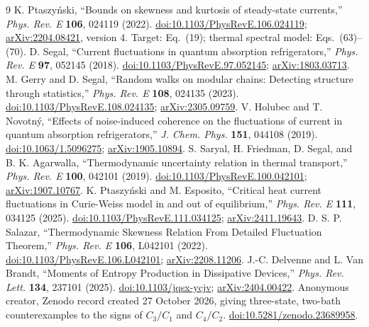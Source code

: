 \documentclass[11pt,a4paper]{article}
\begin{document}
\clearpage
\begingroup\setlength{\parskip}{3pt}
\begin{thebibliography}{9}\setlength{\itemsep}{4pt}
 K. Ptaszy\'nski, ``Bounds on skewness and kurtosis of steady-state currents,'' \emph{Phys. Rev. E} \textbf{106}, 024119 (2022). \href{https://doi.org/10.1103/PhysRevE.106.024119}{doi:10.1103/PhysRevE.106.024119}; \href{https://arxiv.org/abs/2204.08421}{arXiv:2204.08421}, version 4. Target: Eq.~(19); thermal spectral model: Eqs.~(63)--(70).
 D. Segal, ``Current fluctuations in quantum absorption refrigerators,'' \emph{Phys. Rev. E} \textbf{97}, 052145 (2018). \href{https://doi.org/10.1103/PhysRevE.97.052145}{doi:10.1103/PhysRevE.97.052145}; \href{https://arxiv.org/abs/1803.03713}{arXiv:1803.03713}.
 M. Gerry and D. Segal, ``Random walks on modular chains: Detecting structure through statistics,'' \emph{Phys. Rev. E} \textbf{108}, 024135 (2023). \href{https://doi.org/10.1103/PhysRevE.108.024135}{doi:10.1103/PhysRevE.108.024135}; \href{https://arxiv.org/abs/2305.09759}{arXiv:2305.09759}.
 V. Holubec and T. Novotn\'y, ``Effects of noise-induced coherence on the fluctuations of current in quantum absorption refrigerators,'' \emph{J. Chem. Phys.} \textbf{151}, 044108 (2019). \href{https://doi.org/10.1063/1.5096275}{doi:10.1063/1.5096275}; \href{https://arxiv.org/abs/1905.10894}{arXiv:1905.10894}.
 S. Saryal, H. Friedman, D. Segal, and B. K. Agarwalla, ``Thermodynamic uncertainty relation in thermal transport,'' \emph{Phys. Rev. E} \textbf{100}, 042101 (2019). \href{https://doi.org/10.1103/PhysRevE.100.042101}{doi:10.1103/PhysRevE.100.042101}; \href{https://arxiv.org/abs/1907.10767}{arXiv:1907.10767}.
 K. Ptaszy\'nski and M. Esposito, ``Critical heat current fluctuations in Curie-Weiss model in and out of equilibrium,'' \emph{Phys. Rev. E} \textbf{111}, 034125 (2025). \href{https://doi.org/10.1103/PhysRevE.111.034125}{doi:10.1103/PhysRevE.111.034125}; \href{https://arxiv.org/abs/2411.19643}{arXiv:2411.19643}.
 D. S. P. Salazar, ``Thermodynamic Skewness Relation From Detailed Fluctuation Theorem,'' \emph{Phys. Rev. E} \textbf{106}, L042101 (2022). \href{https://doi.org/10.1103/PhysRevE.106.L042101}{doi:10.1103/PhysRevE.106.L042101}; \href{https://arxiv.org/abs/2208.11206}{arXiv:2208.11206}.
 J.-C. Delvenne and L. Van Brandt, ``Moments of Entropy Production in Dissipative Devices,'' \emph{Phys. Rev. Lett.} \textbf{134}, 237101 (2025). \href{https://doi.org/10.1103/jqsx-ycjv}{doi:10.1103/jqsx-ycjv}; \href{https://arxiv.org/abs/2404.00422}{arXiv:2404.00422}.
 Anonymous creator, Zenodo record created 27 October 2026, giving three-state, two-bath counterexamples to the signs of $C_3/C_1$ and $C_4/C_2$. \href{https://doi.org/10.5281/zenodo.23689958}{doi:10.5281/zenodo.23689958}.
\end{thebibliography}
\endgroup
\end{document}
